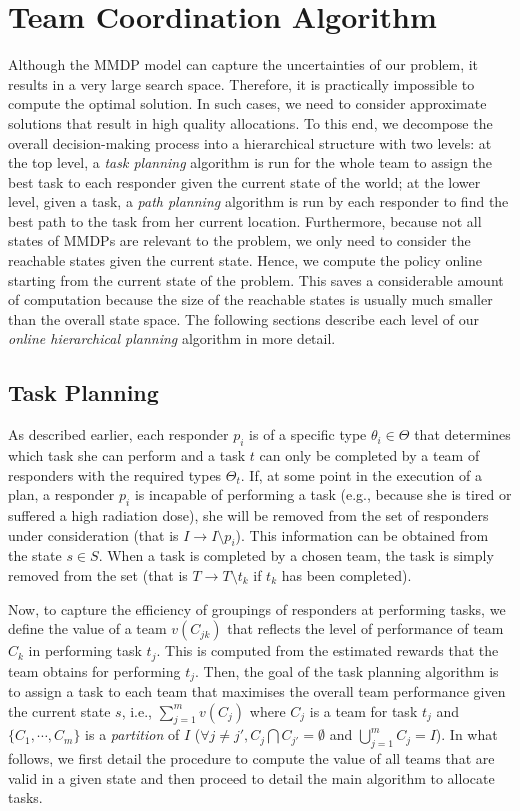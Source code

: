 \section{Team Coordination Algorithm}
\label{sec:algo}

Although the MMDP model can capture the uncertainties of our
problem, it results in a very large search space. Therefore, it is
practically impossible to compute the optimal solution. In such
cases, we need to consider approximate solutions that result in
high quality allocations. To this end, we decompose the overall
decision-making process into a hierarchical structure with two
levels: at the top level, a {\em task planning} algorithm is run
for the whole team to assign the best task to each responder given
the current state of the world; at the lower level, given a task, a
{\em path planning} algorithm is run by each responder to find the
best path to the task from her current location. Furthermore,
because not all states of MMDPs are relevant to the problem, we
only need to consider the reachable states given the current state.
Hence, we compute the policy online starting from the current state
of the problem. This saves a considerable amount of computation
because the size of the reachable states is usually much smaller
than the overall state space. The following sections describe each
level of our {\em online hierarchical planning} algorithm in more
detail.

\subsection{Task Planning}
\label{sec:taskplanning}

As described earlier, each responder $p_i$ is of a specific type
$\theta_i \in \Theta$ that determines which task she can perform
and  a task $t$ can only be completed by a team of responders with
the required types $\Theta_t$. If, at some point in the execution
of a plan, a responder $p_i$ is incapable of performing a task
(e.g., because she is tired or suffered a high radiation dose), she
will be removed from the set of responders under consideration
(that is $I \to I \setminus p_i$). This information can be obtained
from the state $s \in S$. When a task is completed by a chosen
team, the task is simply removed from the set (that is $T \to
T\setminus t_k$ if $t_k$ has been completed).

Now, to capture the efficiency of groupings of responders at
performing tasks, we define the value of a team $v(C_{jk})$ that
reflects the level of performance of team $C_k$ in performing task
$t_j$. This is computed from the estimated rewards that the team
obtains for performing $t_j$.  Then, the goal of the task planning
algorithm is to assign a task to each team that maximises the
overall team performance given the current state $s$, i.e.,
$\sum_{j=1}^m v(C_{j})$ where $C_j$ is a team for task $t_j$ and
$\{ C_1, \cdots, C_m \}$ is a {\em partition} of $I$ ($\forall
j\neq j', C_j \bigcap C_{j'} = \emptyset$ and $\bigcup_{j=1}^m
C_j=I$). In what follows, we first detail the procedure to compute
the value of all teams that are valid in a given state and then
proceed to detail the main algorithm to allocate tasks.


